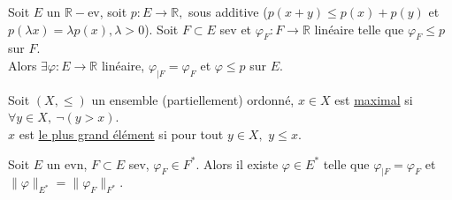 \begin{theoreme}
    Soit $E$ un $\mathbb{R} -$ev, soit $p:E\to \mathbb{R} ,$ sous additive ($p(x+y)\le p(x)+p(y)$ et $p(\lambda x)=\lambda p(x), \lambda>0$). Soit $F\subset E$ sev et $\varphi _F:F\to \mathbb{R} $ linéaire telle que $\varphi_F\le p$ sur $F.$ \\
    Alors $\exists \varphi :E\to \mathbb{R} $ linéaire, $\varphi _{|F}=\varphi _F$ et $\varphi \le p$ sur $E.$
\end{theoreme}
\begin{remarque}
Soit $(X,\le )$ un ensemble (partiellement) ordonné, $x\in X$ est \underline{maximal} si $\forall y\in X,\ \neg(y>x) $.\\
    $x$ est \underline{le plus grand élément} si pour tout $y\in X,$ $y\le x.$
\end{remarque}
\begin{corollaire}
    Soit $E$ un evn, $F\subset E$ sev, $\varphi _F\in F^*.$ Alors il existe $\varphi \in E^*$ telle que $\varphi _{|F}=\varphi _F$ et $\|\varphi \|_{E^*}=\|\varphi_F \|_{F^*}.$
\end{corollaire}

